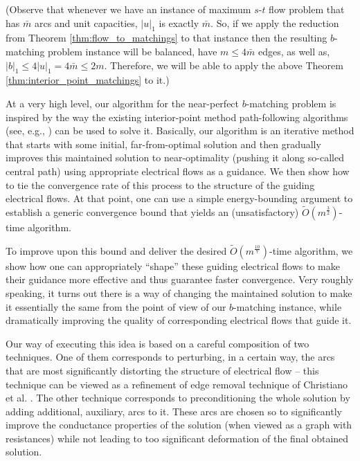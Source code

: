 \documentclass[11pt, letterpaper]{article}
\newcommand{\onorm}[1]{|#1|_{1}}
\newcommand{\tO}[1]{\widetilde{O}(#1)}
\newcommand{\om}{\bar{m}}
\newcommand{\bb}{\boldsymbol{\mathit{b}}}
\newcommand{\uu}{\boldsymbol{\mathit{u}}}
\begin{document}
(Observe that whenever we have an instance of maximum $s$-$t$ flow problem that has $\om$ arcs and unit capacities, $\onorm{\uu}$ is exactly $\om$. So, if we apply the reduction from Theorem \ref{thm:flow_to_matchings} to that instance then the resulting $\bb$-matching problem instance will be balanced, have $m\leq 4 \om$ edges, as well as, $\onorm{\bb}\leq 4\onorm{\uu}= 4\om \leq 2m$. Therefore, we will be able to apply the above Theorem \ref{thm:interior_point_matchings} to it.)




At a very high level, our algorithm for the near-perfect $\bb$-matching problem is inspired by the way the existing interior-point method path-following algorithms  (see, e.g., \cite{Ye97,Wright97,BoydV04}) can be used to solve it. Basically, our algorithm is an iterative method that starts with some initial, far-from-optimal solution and then gradually improves this maintained solution to near-optimality (pushing it along so-called central path)  using appropriate electrical flows as a guidance. We then show how to tie the convergence rate of this process to the structure of the guiding electrical flows. At that point, one can use a simple energy-bounding argument to establish a generic convergence bound that yields an (unsatisfactory) $\tO{m^{\frac{3}{2}}}$-time algorithm.

To improve upon this bound and deliver the desired $\tO{m^{\frac{10}{7}}}$-time algorithm, we show how one can appropriately ``shape'' these guiding electrical flows to make their guidance more effective and thus guarantee faster convergence. Very roughly speaking, it turns out there is a way of changing the maintained solution to make it essentially the same from the point of view of our $\bb$-matching instance, while dramatically improving the quality of corresponding electrical flows that guide it. 

Our way of executing this idea is based on a careful composition of two techniques. One of them  corresponds to perturbing, in a certain way, the arcs that are most significantly distorting the structure of electrical flow -- this technique can be viewed as a refinement of edge removal technique of Christiano et al. \cite{ChristianoKMST11}. The other technique corresponds to preconditioning the whole solution by adding additional, auxiliary, arcs to it. These arcs are chosen so to significantly improve the conductance properties of the solution (when viewed as a graph with resistances) while not leading to too significant deformation of the final obtained solution. 
\end{document}
